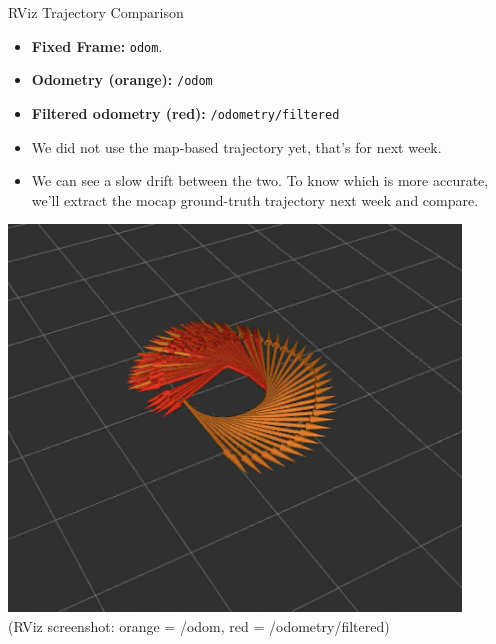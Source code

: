 \documentclass[10pt]{beamer}
\begin{document}
\begin{frame}{RViz Trajectory Comparison}
\begin{itemize}
    \item \textbf{Fixed Frame:} \texttt{odom}.
    \item \textbf{Odometry (orange):} \texttt{/odom}
    \item \textbf{Filtered odometry (red):} \texttt{/odometry/filtered}
    \item We did not use the map-based trajectory yet, that’s for next week.
    \item We can see a slow drift between the two. To know which is more accurate, we’ll extract the mocap ground-truth trajectory next week and compare.
\end{itemize}
\begin{center}
\includegraphics[width=0.9\textwidth]{image.png}
\\[2mm]
\scriptsize (RViz screenshot: orange = /odom, red = /odometry/filtered)
\end{center}
\end{frame}



\end{document}
